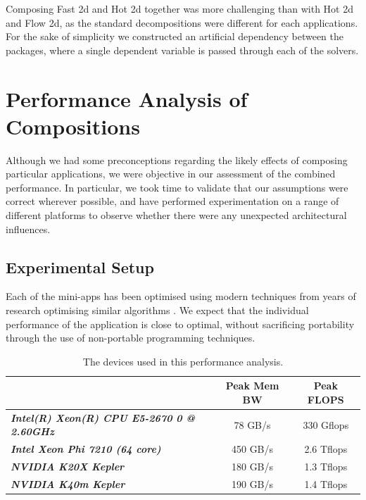 \documentclass[runningheads,a4paper]{llncs}
\begin{document}
Composing Fast 2d and Hot 2d together was more challenging than with Hot 2d and Flow 2d, as the standard decompositions were different for each applications. For the sake of simplicity we constructed an artificial dependency between the packages, where a single dependent variable is passed through each of the solvers.

\section{Performance Analysis of Compositions}

Although we had some preconceptions regarding the likely effects of composing particular applications, we were objective in our assessment of the combined performance. In particular, we took time to validate that our assumptions were correct wherever possible, and have performed experimentation on a range of different platforms to observe whether there were any unexpected architectural influences.

\subsection{Experimental Setup}

Each of the mini-apps has been optimised using modern techniques from years of research optimising similar algorithms \cite{Bird2013} \cite{}. We expect that the individual performance of the application is close to optimal, without sacrificing portability through the use of non-portable programming techniques. 

\begin{table}[h]
  \begin{center}
    \begin{tabular}{l|c|c}
      \hline
      \textbf{} & \textbf{Peak Mem BW} & \textbf{Peak FLOPS}  \\
      \hline
      \textit{\textbf{Intel(R) Xeon(R) CPU E5-2670 0 @ 2.60GHz}} & 78 GB/s & 330 Gflops \\
      \textit{\textbf{Intel Xeon Phi 7210 (64 core)}} & 450 GB/s & 2.6 Tflops \\
      \textit{\textbf{NVIDIA K20X Kepler}} & 180 GB/s & 1.3 Tflops \\
      \textit{\textbf{NVIDIA K40m Kepler}} & 190 GB/s & 1.4 Tflops \\
    \end{tabular}
  \end{center}
  \caption{The devices used in this performance analysis.}
  \label{tab:hardware}
\end{table}
\end{document}

